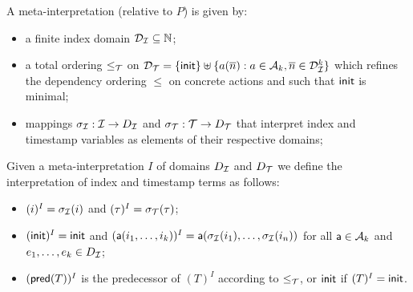 \begin{definition}
  A meta-interpretation (relative to $P$) is given by:
  \begin{itemize}
    \item a finite index domain $\mathcal{D}_{\mathcal{I}} \subseteq \mathbb{N}$;
    \item a total ordering $\leq_{\mathcal{T}}$ on
      $\mathcal{D}_{\mathcal{T}} = \{ \mathsf{init} \} \uplus \{ a(\overline{n}) : a\in\mathcal{A}_k,
      \overline{n}\in\mathcal{D}_{\mathcal{I}}^k \}$ which refines the dependency ordering
      $\leq$ on concrete actions and such that $\mathsf{init}$ is minimal;
    \item mappings $\sigma_{\mathcal{I}} : \mathcal{I} \to D_{\mathcal{I}}$
      and $\sigma_{\mathcal{T}} : \mathcal{T} \to D_{\mathcal{T}}$ that interpret index and
      timestamp variables as elements of their respective domains;
  \end{itemize}
\end{definition}

\newcommand{\interp}[1]{(#1)}

Given a meta-interpretation $I$ of domains $D_{\mathcal{I}}$ and $D_{\mathcal{T}}$
we define the interpretation of index and timestamp terms as
follows:
\begin{itemize}
  \item $\interp{i}^I = \sigma_\I(i)$ and $\interp{\tau}^I = \sigma_\XT(\tau)$;
  \item $\interp{\tinit}^I = \tinit$ and
    $\interp{\sfa(i_1,\ldots,i_k)}^I =
     \sfa(\sigma_\I(i_1),\ldots,\sigma_\I(i_n))$
    for all $\textsf{a}\in\mathcal{A}_k$ and $e_1,\ldots,e_k\in D_{\mathcal{I}}$;
  \item $\interp{\tpred{T}}^I$ is the predecessor of $\interp{T}^I$
    according to ${\leq}_{\mathcal{T}}$, or $\mathsf{init}$ if $\interp{T}^I = \tinit$.
\end{itemize}

